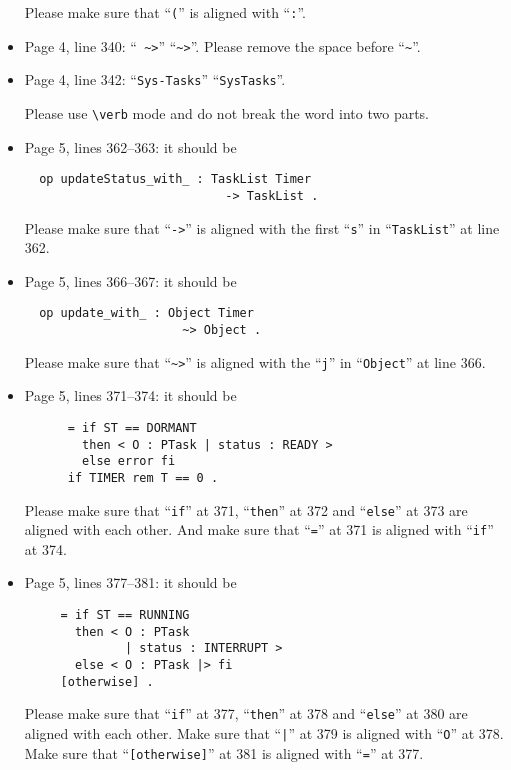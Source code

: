 \documentclass[12pt,onecolumn]{IEEEtranTIE}
\begin{document}
\begin{itemize}
Please make sure that ``\verb|(|'' is aligned with ``\verb|:|''.

\item Page 4, line 340: ``\verb| ~>|'' \by ``\verb|~>|''. Please
  remove the space before ``\verb|~|''.

\item Page 4, line 342: ``\verb|Sys-Tasks|'' \by ``\verb|SysTasks|''.

Please use \verb|\verb| mode and do not break the word into two parts.


\item Page 5, lines 362--363: it should be
\begin{verbatim}
  op updateStatus_with_ : TaskList Timer 
                            -> TaskList . 
\end{verbatim}

Please make sure that ``\verb|->|'' is aligned with the first
``\verb|s|'' in ``\verb|TaskList|'' at line 362.

\item Page 5, lines 366--367: it should be
\begin{verbatim}
  op update_with_ : Object Timer 
                      ~> Object .
\end{verbatim}

Please make sure that ``\verb|~>|'' is aligned with the ``\verb|j|''
in ``\verb|Object|'' at line 366.


\item Page 5, lines 371--374: it should be
\begin{verbatim}
      = if ST == DORMANT 
        then < O : PTask | status : READY >
        else error fi
      if TIMER rem T == 0 .
\end{verbatim}

Please make sure that ``\verb|if|'' at 371, ``\verb|then|'' at 372 and
``\verb|else|'' at 373 are aligned with each other. And make sure that
``\verb|=|'' at 371 is aligned with ``\verb|if|'' at 374.


\item Page 5, lines 377--381: it should be
\begin{verbatim}
     = if ST == RUNNING 
       then < O : PTask 
              | status : INTERRUPT >
       else < O : PTask |> fi 
     [otherwise] .
\end{verbatim}

Please make sure that ``\verb|if|'' at 377, ``\verb|then|'' at 378 and
``\verb|else|'' at 380 are aligned with each other. Make sure that
``\verb+|+'' at 379 is aligned with ``\verb|O|'' at 378. Make sure
that ``\verb|[otherwise]|'' at 381 is aligned with ``\verb|=|'' at
377.



\end{itemize}
\end{document}
